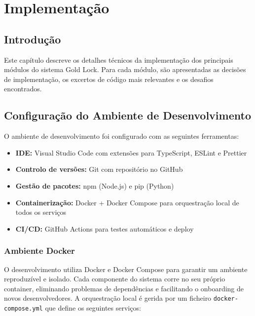 \chapter{Implementação}
\label{chap:implementacao}

\section{Introdução}
\label{sec:impl-intro}

Este capítulo descreve os detalhes técnicos da implementação dos principais módulos do sistema Gold Lock. Para cada módulo, são apresentadas as decisões de implementação, os excertos de código mais relevantes e os desafios encontrados.



\section{Configuração do Ambiente de Desenvolvimento}
\label{sec:impl-setup}

O ambiente de desenvolvimento foi configurado com as seguintes ferramentas:

\begin{itemize}
    \item \textbf{IDE:} Visual Studio Code com extensões para TypeScript, ESLint e Prettier
    \item \textbf{Controlo de versões:} Git com repositório no GitHub
    \item \textbf{Gestão de pacotes:} npm (Node.js) e pip (Python)
    \item \textbf{Containerização:} Docker + Docker Compose para orquestração local de todos os serviços
    \item \textbf{CI/CD:} GitHub Actions para testes automáticos e deploy
\end{itemize}

\subsection{Ambiente Docker}
\label{sec:impl-docker}

O desenvolvimento utiliza Docker e Docker Compose para garantir um ambiente reproduzível e isolado. Cada componente do sistema corre no seu próprio container, eliminando problemas de dependências e facilitando o onboarding de novos desenvolvedores. A orquestração local é gerida por um ficheiro \texttt{docker-compose.yml} que define os seguintes serviços:

